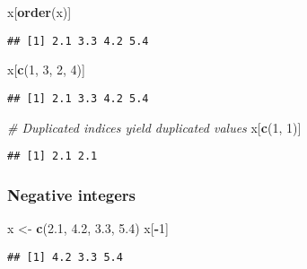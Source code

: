 \documentclass[
]{book}
\newenvironment{Shaded}{\begin{snugshade}}{\end{snugshade}}
\newcommand{\CommentTok}[1]{\textcolor[rgb]{0.56,0.35,0.01}{\textit{#1}}}
\newcommand{\DecValTok}[1]{\textcolor[rgb]{0.00,0.00,0.81}{#1}}
\newcommand{\FloatTok}[1]{\textcolor[rgb]{0.00,0.00,0.81}{#1}}
\newcommand{\KeywordTok}[1]{\textcolor[rgb]{0.13,0.29,0.53}{\textbf{#1}}}
\newcommand{\NormalTok}[1]{#1}
\newcommand{\OperatorTok}[1]{\textcolor[rgb]{0.81,0.36,0.00}{\textbf{#1}}}
\newcommand{\StringTok}[1]{\textcolor[rgb]{0.31,0.60,0.02}{#1}}
\begin{document}
\begin{Shaded}
\begin{Highlighting}[]
\NormalTok{x[}\KeywordTok{order}\NormalTok{(x)]}
\end{Highlighting}
\end{Shaded}

\begin{verbatim}
## [1] 2.1 3.3 4.2 5.4
\end{verbatim}

\begin{Shaded}
\begin{Highlighting}[]
\NormalTok{x[}\KeywordTok{c}\NormalTok{(}\DecValTok{1}\NormalTok{, }\DecValTok{3}\NormalTok{, }\DecValTok{2}\NormalTok{, }\DecValTok{4}\NormalTok{)]}
\end{Highlighting}
\end{Shaded}

\begin{verbatim}
## [1] 2.1 3.3 4.2 5.4
\end{verbatim}

\begin{Shaded}
\begin{Highlighting}[]
\CommentTok{\# Duplicated indices yield duplicated values}
\NormalTok{x[}\KeywordTok{c}\NormalTok{(}\DecValTok{1}\NormalTok{, }\DecValTok{1}\NormalTok{)]}
\end{Highlighting}
\end{Shaded}

\begin{verbatim}
## [1] 2.1 2.1
\end{verbatim}

\hypertarget{negative-integers}{%
\subsubsection{Negative integers}\label{negative-integers}}

\begin{Shaded}
\begin{Highlighting}[]
\NormalTok{x \textless{}{-}}\StringTok{ }\KeywordTok{c}\NormalTok{(}\FloatTok{2.1}\NormalTok{, }\FloatTok{4.2}\NormalTok{, }\FloatTok{3.3}\NormalTok{, }\FloatTok{5.4}\NormalTok{)}
\NormalTok{x[}\OperatorTok{{-}}\DecValTok{1}\NormalTok{]}
\end{Highlighting}
\end{Shaded}

\begin{verbatim}
## [1] 4.2 3.3 5.4
\end{verbatim}
\end{document}
